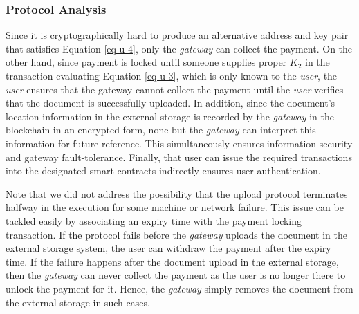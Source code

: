 \subsubsection*{Protocol Analysis}
Since it is cryptographically hard to produce an alternative address and key pair that satisfies Equation \ref{eq-u-4}, only the {\it gateway} can collect the payment. On the other hand, since payment is locked until someone supplies proper $K_2$ in the transaction evaluating Equation \ref{eq-u-3}, which is only known to the {\it user}, the {\it user} ensures that the gateway cannot collect the payment until the {\it user} verifies that the document is successfully uploaded. In addition, since the document's location information in the external storage is recorded by the {\it gateway} in the blockchain in an encrypted form, none but the {\it gateway} can interpret this information for future reference. This simultaneously ensures information security and gateway fault-tolerance. Finally, that user can issue the required transactions into the designated smart contracts indirectly ensures user authentication.

Note that we did not address the possibility that the upload protocol terminates halfway in the execution for some machine or network failure. This issue can be tackled easily by associating an expiry time with the payment locking transaction. If the protocol fails before the {\it gateway} uploads the document in the external storage system, the user can withdraw the payment after the expiry time. If the failure happens after the document upload in the external storage, then the {\it gateway} can never collect the payment as the user is no longer there to unlock the payment for it. Hence, the {\it gateway} simply removes the document from the external storage in such cases.      

